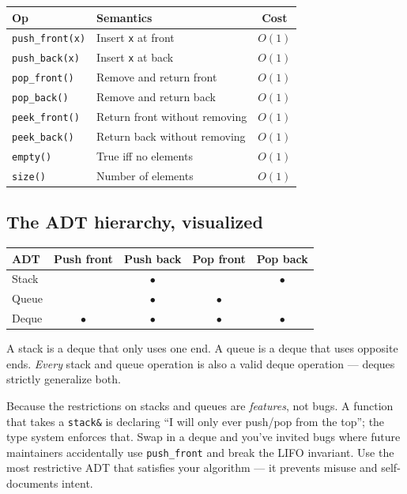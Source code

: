 \documentclass[11pt]{article}
\begin{document}
\begin{center}
\begin{tabular}{|l|l|c|}
\hline
\textbf{Op} & \textbf{Semantics} & \textbf{Cost} \\
\hline
\texttt{push\_front(x)}  & Insert \texttt{x} at front       & $O(1)$ \\
\texttt{push\_back(x)}   & Insert \texttt{x} at back        & $O(1)$ \\
\texttt{pop\_front()}    & Remove and return front          & $O(1)$ \\
\texttt{pop\_back()}     & Remove and return back           & $O(1)$ \\
\texttt{peek\_front()}   & Return front without removing    & $O(1)$ \\
\texttt{peek\_back()}    & Return back without removing     & $O(1)$ \\
\texttt{empty()}         & True iff no elements             & $O(1)$ \\
\texttt{size()}          & Number of elements               & $O(1)$ \\
\hline
\end{tabular}
\end{center}

\subsection*{The ADT hierarchy, visualized}

\begin{center}
\begin{tabular}{|l|c|c|c|c|}
\hline
\textbf{ADT} & \textbf{Push front} & \textbf{Push back} & \textbf{Pop front} & \textbf{Pop back} \\
\hline
Stack  &            &     $\bullet$     &             &     $\bullet$     \\
Queue  &            &     $\bullet$     &  $\bullet$ &                    \\
Deque  & $\bullet$ &     $\bullet$     &  $\bullet$ &     $\bullet$     \\
\hline
\end{tabular}
\end{center}

A stack is a deque that only uses one end. A queue is a deque that
uses opposite ends. \emph{Every} stack and queue operation is also
a valid deque operation --- deques strictly generalize both.

\begin{ideabox}
Because the restrictions on stacks and queues are \emph{features},
not bugs. A function that takes a \texttt{stack\&} is declaring
``I will only ever push/pop from the top''; the type system
enforces that. Swap in a deque and you've invited bugs where
future maintainers accidentally use \texttt{push\_front} and
break the LIFO invariant. Use the most restrictive ADT that
satisfies your algorithm --- it prevents misuse and
self-documents intent.
\end{ideabox}
\end{document}
